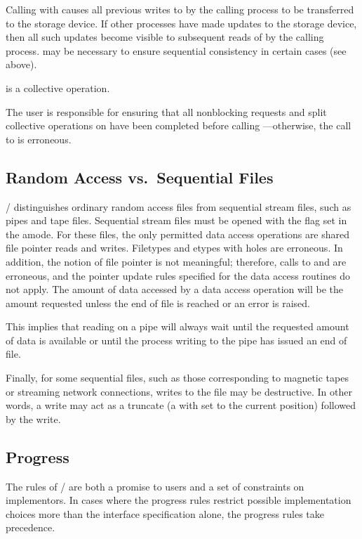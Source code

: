 Calling  with  causes
all previous writes to  by the calling process 
to be transferred to the storage device.
If other processes have made updates to the storage device,
then all such updates become visible to
subsequent reads of  by the calling process.
may be necessary to ensure sequential consistency in certain
cases (see above).

 is a collective operation.

The user is responsible for ensuring that all nonblocking requests
and split collective operations
on  have been completed before calling
---otherwise, the call to
 is erroneous.

\subsection{Random Access vs.\ Sequential Files}
\MPI/ distinguishes ordinary random access files from sequential
stream files, such as pipes and tape files.
Sequential stream files must be opened with the 
flag set in the amode.
For these files,
the only permitted data access operations are
shared file pointer reads and writes.
Filetypes and etypes with holes are erroneous.
In addition, the notion of file pointer is not meaningful;
therefore, calls to  and
 are erroneous,
and the pointer update rules specified for the data access routines
do not apply.
The amount of data accessed by a data access operation will be
the amount requested unless
the end of file is reached or an error is raised.

\begin{rationale}
This implies that reading on a pipe will always wait until the
requested amount of data is available or until the process
writing to the pipe has issued an end of file.
\end{rationale}

Finally,
for some sequential files,
such as those corresponding to magnetic tapes or streaming network connections,
writes to the file may be destructive.
In other words, a write may act as a truncate
(a  with  set to the current position)
followed by the write.

\subsection{Progress}
\label{sec:io-intro-progress}
The 
rules of \MPI/ are both a promise to users
and a set of constraints on implementors.
In cases where the progress rules restrict
possible implementation choices more than the interface specification alone,
the progress rules take precedence.

